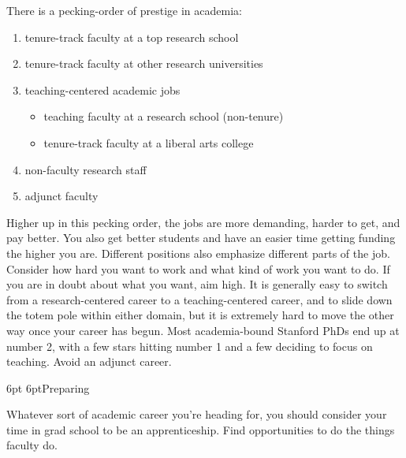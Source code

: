 \documentclass[10pt]{book}
\makeatletter
\def\phd{{\sc PhD}}
\renewcommand{\subsection}{\@startsection{subsection}{2}{0mm}%
   {6pt}%
   {6pt}{\normalfont\normalsize\itshape}}
\makeatother
\begin{document}
There is a pecking-order of prestige in academia:

\begin{enumerate}
\setlength{\itemsep}{1pt}
\setlength{\parskip}{0pt}
\setlength{\parsep}{0pt}
\item tenure-track faculty at a top research school
\item tenure-track faculty at other research universities
\item teaching-centered academic jobs
\begin{itemize}
\item teaching faculty at a research school (non-tenure)
\item tenure-track faculty at a liberal arts college
\end{itemize}
\item non-faculty research staff
\item adjunct faculty
\end{enumerate}

Higher up in this pecking order, the jobs are more demanding, harder to get,
and pay better.  You also get better students and have an easier time getting
funding the higher you are.  Different positions also emphasize different parts
of the job.  Consider how hard you want to work and what kind of work you want
to do. If you are in doubt about what you want, aim high.  It is generally easy
to switch from a research-centered career to a teaching-centered career, and to
slide down the totem pole within either domain, but it is extremely hard to
move the other way once your career has begun.  Most academia-bound Stanford
\phd s end up at number 2, with a few stars hitting number 1 and a few deciding
to focus on teaching.  Avoid an adjunct career.

\subsection{Preparing}

Whatever sort of academic career you're heading for, you should consider your
time in grad school to be an apprenticeship.  Find opportunities to do the
things faculty do.
\end{document}
